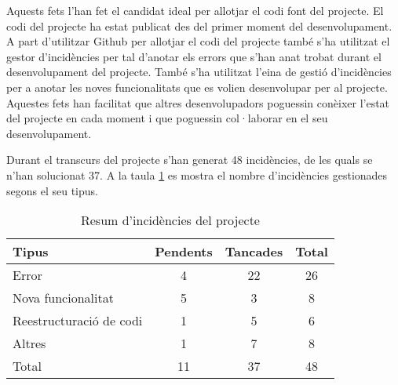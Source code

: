 Aquests fets l'han fet el candidat ideal per allotjar el codi font del projecte. El codi del projecte ha estat publicat des del primer moment del desenvolupament. A part d'utilitzar Github per allotjar el codi del projecte també s'ha utilitzat el gestor d'incidències per tal d'anotar els errors que s'han anat trobat durant el desenvolupament del projecte. També s'ha utilitzat l'eina de gestió d'incidències per a anotar les noves funcionalitats que es volien desenvolupar per al projecte. Aquestes fets han facilitat que altres desenvolupadors poguessin conèixer l'estat del projecte en cada moment i que poguessin col·laborar en el seu desenvolupament. 

Durant el transcurs del projecte s'han generat 48 incidències, de les quals se n'han solucionat 37. A la taula \ref{t:resum-incidencies} es mostra el nombre d'incidències gestionades segons el seu tipus.

\begin{table}[htbp]\begin{center}\begin{tabular}{|l|c|c|c|}
\hline
\textbf{Tipus} & \textbf{Pendents} & \textbf{Tancades} & \textbf{Total} \\ \hline
Error & 4 & 22 & 26 \\ \hline
Nova  funcionalitat & 5 & 3 & 8 \\ \hline
Reestructuració de codi & 1 & 5 & 6 \\ \hline
Altres & 1 & 7 & 8 \\ \hline
Total & 11 & 37 & 48 \\ \hline
\end{tabular}\end{center}
\caption{Resum d'incidències del projecte}\label{t:resum-incidencies}
\end{table} 

